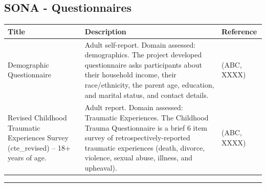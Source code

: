 \documentclass[
]{book}
\begin{document}
\hypertarget{sona---questionnaires}{%
\subsection{SONA - Questionnaires}\label{sona---questionnaires}}

\begin{longtable}[]{@{}lll@{}}
\toprule
\begin{minipage}[b]{0.32\columnwidth}\raggedright
Title\strut
\end{minipage} & \begin{minipage}[b]{0.32\columnwidth}\raggedright
Description\strut
\end{minipage} & \begin{minipage}[b]{0.27\columnwidth}\raggedright
Reference\strut
\end{minipage}\tabularnewline
\midrule
\endhead
\begin{minipage}[t]{0.32\columnwidth}\raggedright
Demographic Questionnaire\strut
\end{minipage} & \begin{minipage}[t]{0.32\columnwidth}\raggedright
Adult self-report. Domain assessed: demographics. The project developed questionnaire asks participants about their household income, their race/ethnicity, the parent age, education, and marital status, and contact details.\strut
\end{minipage} & \begin{minipage}[t]{0.27\columnwidth}\raggedright
(ABC, XXXX)\strut
\end{minipage}\tabularnewline
\begin{minipage}[t]{0.32\columnwidth}\raggedright
Revised Childhood Traumatic Experiences Survey (cte\_revised) -- 18+ years of age.\strut
\end{minipage} & \begin{minipage}[t]{0.32\columnwidth}\raggedright
Adult report. Domain assessed: Traumatic Experiences. The Childhood Trauma Questionnaire is a brief 6 item survey of retrospectively-reported traumatic experiences (death, divorce, violence, sexual abuse, illness, and upheaval).\strut
\end{minipage} & \begin{minipage}[t]{0.27\columnwidth}\raggedright
(ABC, XXXX)\strut
\end{minipage}\tabularnewline
\bottomrule
\end{longtable}

\begin{center}\rule{0.5\linewidth}{0.5pt}\end{center}
\end{document}
